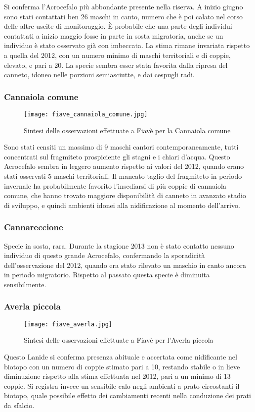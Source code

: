 \documentclass[11pt,a4paper,twoside]{memoir}
\begin{document}
Si conferma l'Acrocefalo più abbondante presente nella riserva. A inizio giugno sono stati contattati ben 26 maschi in canto, numero che è poi calato nel corso delle altre uscite di monitoraggio. È probabile che una parte degli individui contattati a inizio maggio fosse in parte in sosta migratoria, anche se un individuo è stato osservato già con imbeccata. La stima rimane invariata rispetto a quella del 2012, con un numero minimo di maschi territoriali e di coppie, elevato, e pari a 20. La specie sembra esser stata favorita dalla ripresa del canneto, idoneo nelle porzioni semiasciutte, e dai cespugli radi. 

\subsubsection{Cannaiola comune}
\vspace*{\fill}
\begin{figure}[H]
  \centering
  \texttt{[image: fiave\_cannaiola\_comune.jpg]}
  \caption{Sintesi delle osservazioni effettuate a Fiavè per la Cannaiola comune}
\end{figure}\vspace*{\fill}
Sono stati censiti un massimo di 9 maschi cantori contemporaneamente, tutti concentrati sul fragmiteto prospiciente gli stagni e i chiari d'acqua. Questo Acrocefalo sembra in leggero aumento rispetto ai valori del 2012, quando erano stati osservati 5 maschi territoriali. Il mancato taglio del fragmiteto in periodo invernale ha probabilmente favorito l'insediarsi di più coppie di cannaiola comune, che hanno trovato maggiore disponibilità di canneto in avanzato stadio di sviluppo, e quindi ambienti idonei alla nidificazione al momento dell’arrivo.

\subsubsection{Cannareccione}
Specie in sosta, rara. Durante la stagione 2013 non è stato contatto nessuno individuo di questo grande Acrocefalo, confermando la sporadicità dell'osservazione del 2012, quando era stato rilevato un maschio in canto ancora in periodo migratorio. Rispetto al passato questa specie è diminuita sensibilmente.

\subsubsection{Averla piccola}
\vspace*{\fill}
\begin{figure}[H]
  \centering
  \texttt{[image: fiave\_averla.jpg]}
  \caption{Sintesi delle osservazioni effettuate a Fiavè per l'Averla piccola}
\end{figure}\vspace*{\fill}
Questo Lanide si conferma presenza abituale e accertata come nidificante nel  biotopo con un numero di coppie stimato pari a 10, restando stabile o in lieve diminuzione rispetto alla stima effettuata nel 2012, pari a un minimo di 13 coppie. Si registra invece un sensibile calo negli ambienti a prato circostanti il biotopo, quale possibile effetto dei cambiamenti recenti nella conduzione dei prati da sfalcio.
\end{document}
